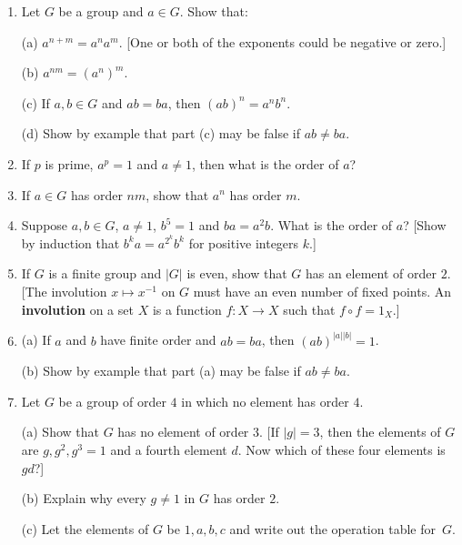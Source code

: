 \documentclass[leqno]{book}
\begin{document}
\begin{enumerate}
(q) $\mathbb R$ under the operation $a*b=a+b-ab$.

(r) $\mathbb R-\{1\}$ under the operation $a*b= a+b-ab$.

\item Let $G$ be a group and $a\in G$.  Show that: %

(a) $a^{n+m}=a^na^m$.  [One or both of the exponents could be negative or zero.]

(b) $a^{nm}=(a^n)^m$.

(c) If $a,b\in G$ and $ab=ba$, then $(ab)^n=a^nb^n$.

(d) Show by example that part (c) may be false if $ab\ne ba$.

\item If $p$ is prime, $a^p=1$ and $a\ne 1$, then what is the order of $a$?

\item If $a\in G$ has order $nm$, show that $a^n$ has order $m$.

\item Suppose $a,b\in G$, $a\ne 1$, $b^5=1$ and $ba=a^2b$.  What is the order of $a$?  [Show by induction that $b^ka=a^{2^k}b^k$ for positive integers $k$.]

\item If $G$ is a finite group and $|G|$ is even, show that $G$ has an element of order $2$.  [The involution $x\mapsto x^{-1}$ on $G$ must have an even number of fixed points.  An \textbf{involution} on a set $X$ is a function $f:X\to X$ such that $f\circ f=1_X$.]

\item (a) If $a$ and $b$ have finite order and $ab=ba$, then $(ab)^{|a||b|}=1$.

(b) Show by example that part (a) may be false if $ab\ne ba$.

\item Let $G$ be a group of order $4$ in which no element has order $4$.

(a) Show that $G$ has no element of order $3$.  [If $|g|=3$, then the elements of $G$ are $g,g^2,g^3=1$ and a fourth element $d$.  Now which of these four elements is $gd$?]

(b) Explain why every $g\ne 1$ in $G$ has order $2$.

(c) Let the elements of $G$ be $1,a,b,c$ and write out the operation table for~$G$.


\end{enumerate}
\end{document}
